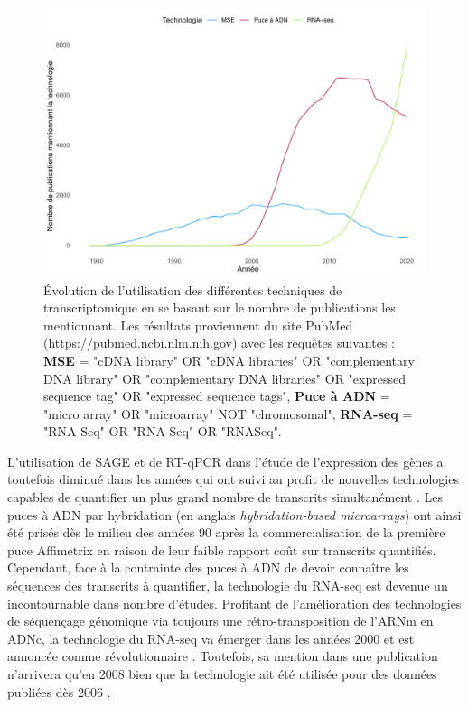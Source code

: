 \begin{figure}[!ht]
    \centering
    \includegraphics[width=\textwidth]{img/intro/count_by_year_rnaseq_microarray_est.pdf}
    \caption[Évolution de l'utilisation des différentes techniques de transcriptomique en se basant sur le nombre de publications les mentionnant]{Évolution de l'utilisation des différentes techniques de transcriptomique en se basant sur le nombre de publications les mentionnant. Les résultats proviennent du site PubMed (\url{https://pubmed.ncbi.nlm.nih.gov}) avec les requêtes suivantes : \textbf{MSE} = "cDNA library" OR "cDNA libraries" OR "complementary DNA library" OR "complementary DNA libraries" OR "expressed sequence tag" OR "expressed sequence tags", \textbf{Puce à ADN} = "micro array" OR "microarray" NOT "chromosomal", \textbf{RNA-seq} = "RNA Seq" OR "RNA-Seq" OR "RNASeq".}
    \label{fig:count_by_year_rnaseq_microarray_est}
\end{figure}


L'utilisation de SAGE et de RT-qPCR dans l'étude de l'expression des gènes a toutefois diminué dans les années qui ont suivi au profit de nouvelles technologies capables de quantifier un plus grand nombre de transcrits simultanément \cite{Lowe2017May}. Les puces à ADN par hybridation (en anglais \textit{hybridation-based microarrays}) ont ainsi été prisés dès le milieu des années 90 \cite{Schena1995Oct} après la commercialisation de la première puce Affimetrix \cite{Lenoir2006} en raison de leur faible rapport coût sur transcrits quantifiés. Cependant, face à la contrainte des puces à ADN de devoir connaître les séquences des transcrits à quantifier, la technologie du RNA-seq est devenue un incontournable dans nombre d'études. 
Profitant de l'amélioration des technologies de séquençage génomique via toujours une rétro-transposition de l'ARNm en ADNc, la technologie du RNA-seq va émerger dans les années 2000 et est annoncée comme révolutionnaire \cite{Wang2009Jan}. Toutefois, sa mention dans une publication n'arrivera qu'en 2008 \cite{Nagalakshmi2008Jun} bien que la technologie ait été utilisée pour des données publiées dès 2006 \cite{Cheung2006Dec}.

